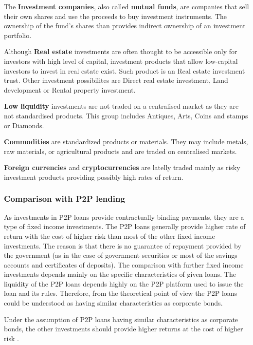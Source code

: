 The \textbf{Investment companies}, also called \textbf{mutual funds}, are companies that sell their own shares and use the proceeds to buy investment instruments. The ownership of the fund's shares than provides indirect ownership of an investment portfolio. \cite[]{Reilly2000}

Although \textbf{Real estate} investments are often thought to be accessible only for investors with high level of capital, investment products that allow low-capital investors to invest in real estate exist. Such product is an Real estate investment trust. Other investment possibilites are Direct real estate investment, Land development or Rental property investment. \cite[]{Reilly2000}

\textbf{Low liquidity} investments are not traded on a centralised market as they are not standardised products. This group includes Antiques, Arts, Coins and stamps or Diamonds. \cite[]{Reilly2000}

\textbf{Commodities} are standardized products or materials. They may include metals, raw materials, or agricultural products and are traded on centralised markets.

\textbf{Foreign currencies} and \textbf{cryptocurrencies} are latelly traded mainly as risky investment products providing possibly high rates of return.

\subsubsection{Comparison with P2P lending}

As investments in P2P loans provide contractually binding payments, they are a type of fixed income investments. The P2P loans generally provide higher rate of return with the cost of higher risk than most of the other fixed income investments. The reason is that there is no guarantee of repayment provided by the government (as in the case of government securities or most of the savings accounts and certificates of deposits). The comparison with further fixed income investments depends mainly on the specific characteristics of given loans. The liquidity of the P2P loans depends highly on the P2P platform used to issue the loan and its rules. Therefore, from the theoretical point of view the P2P loans could be understood as having similar characteristics as corporate bonds.

Under the assumption of P2P loans having similar characteristics as corporate bonds, the other investments should provide higher returns at the cost of higher risk \cite[]{Reilly2000}.

